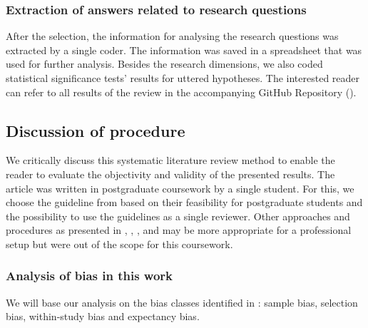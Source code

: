 \subsubsection{Extraction of answers related to research questions}

After the selection, the information for analysing the research questions was extracted by a single coder. The information was saved in a spreadsheet that was used for further analysis. Besides the research dimensions, we also coded statistical significance tests' results for uttered hypotheses. The interested reader can refer to all results of the review in the accompanying GitHub Repository (\cite{langenbahn_smartphone_2021}).  


\subsection{Discussion of procedure}

We critically discuss this systematic literature review method to enable the reader to evaluate the objectivity and validity of the presented results. The article was written in postgraduate coursework by a single student. For this, we choose the guideline from \cite{silva_systematic_2016} based on their feasibility for postgraduate students and the possibility to use the guidelines as a single reviewer. Other approaches and procedures as presented in \cite{xiao_guidance_2017}, \cite{petticrew_systematic_2008}, \cite{snyder_literature_2019}, and \cite{denyer_producing_2009} may be more appropriate for a professional setup but were out of the scope for this coursework. 


\subsubsection{Analysis of bias in this work}

We will base our analysis on the bias classes identified in \cite{durach_new_2017}: sample bias, selection bias, within-study bias and expectancy bias.

